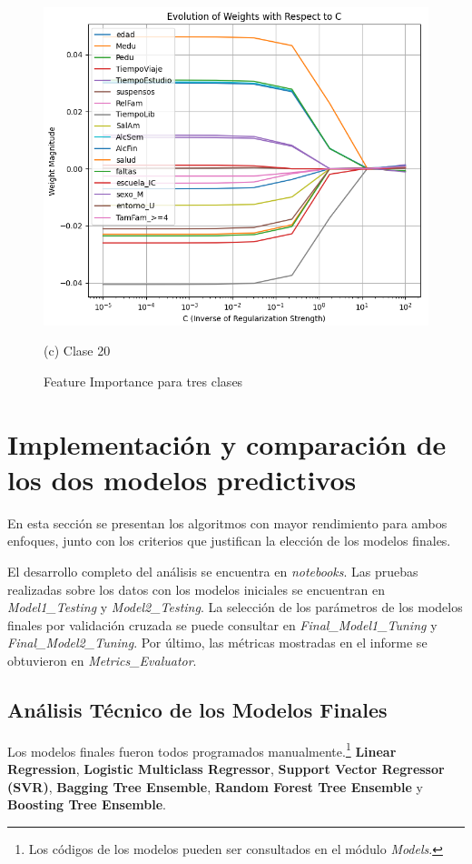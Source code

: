 \documentclass{article}
\begin{document}
\begin{figure}[H]
\begin{minipage}[b]{0.3\textwidth}
      \centering
      \includegraphics[scale=0.25]{FI_Class20.png}
      \caption{(c) Clase 20}
  \end{minipage}
  \caption{Feature Importance para tres clases}
\end{figure}


\section{Implementación y comparación de los dos modelos predictivos}

En esta sección se presentan los algoritmos con mayor rendimiento para ambos enfoques, junto con los criterios que justifican la elección de los modelos finales.

El desarrollo completo del análisis se encuentra en \textit{notebooks}. Las pruebas realizadas sobre los datos con los modelos iniciales se encuentran en \textit{Model1\_Testing} y \textit{Model2\_Testing}.
La selección de los parámetros de los modelos finales por validación cruzada se puede consultar en \textit{Final\_Model1\_Tuning} y \textit{Final\_Model2\_Tuning}. Por último, las métricas mostradas en el informe
se obtuvieron en \textit{Metrics\_Evaluator}.

\subsection{Análisis Técnico de los Modelos Finales}
Los modelos finales fueron todos programados manualmente.\footnote{Los códigos de los modelos pueden ser consultados en el módulo \textit{Models}.} \textbf{Linear Regression}, \textbf{Logistic Multiclass Regressor},
\textbf{Support Vector Regressor (SVR)}, \textbf{Bagging Tree Ensemble}, \textbf{Random Forest Tree Ensemble} y \textbf{Boosting Tree Ensemble}.
\end{document}

